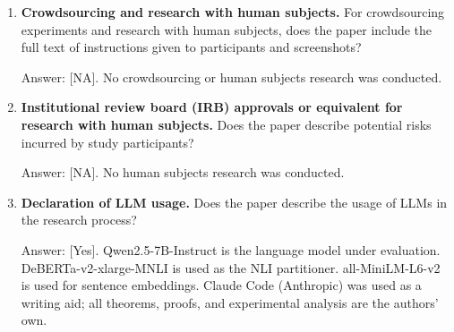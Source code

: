 \documentclass{article}
\begin{document}
\begin{enumerate}
Answer: [NA]. No new datasets are released. Code documentation will accompany the code release.

\item \textbf{Crowdsourcing and research with human subjects.} For crowdsourcing experiments and research with human subjects, does the paper include the full text of instructions given to participants and screenshots?

Answer: [NA]. No crowdsourcing or human subjects research was conducted.

\item \textbf{Institutional review board (IRB) approvals or equivalent for research with human subjects.} Does the paper describe potential risks incurred by study participants?

Answer: [NA]. No human subjects research was conducted.

\item \textbf{Declaration of LLM usage.} Does the paper describe the usage of LLMs in the research process?

Answer: [Yes]. Qwen2.5-7B-Instruct is the language model under evaluation. DeBERTa-v2-xlarge-MNLI is used as the NLI partitioner. all-MiniLM-L6-v2 is used for sentence embeddings. Claude Code (Anthropic) was used as a writing aid; all theorems, proofs, and experimental analysis are the authors' own.

\end{enumerate}
\end{document}
